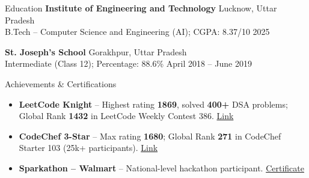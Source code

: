 \documentclass{resume}
\begin{document}
\vspace{-0.5em}
\begin{rSection}{Education}
\vspace{-0.8em}
{\bf Institute of Engineering and Technology} \hfill {Lucknow, Uttar Pradesh}\\
B.Tech -- Computer Science and Engineering (AI); CGPA: 8.37/10 \hfill {2025}

{\bf St. Joseph's School} \hfill {Gorakhpur, Uttar Pradesh}\\
Intermediate (Class 12); Percentage: 88.6\% \hfill {April 2018 -- June 2019}
\end{rSection}

\vspace{-0.5em}
\begin{rSection}{Achievements \& Certifications}
\vspace{-1.0em}
\begin{itemize}
    \item \textbf{LeetCode Knight} -- Highest rating \textbf{1869}, solved \textbf{400+} DSA problems; Global Rank \textbf{1432} in LeetCode Weekly Contest
386. \href{https://leetcode.com/ashishmaurya57/}{Link}
    \item \textbf{CodeChef 3-Star} -- Max rating \textbf{1680}; Global Rank \textbf{271} in CodeChef Starter 103 (25k+ participants).
\href{https://www.codechef.com/users/ashishmauryaam/}{Link}
    \item \textbf{Sparkathon -- Walmart} -- National-level hackathon participant.
\href{https://drive.google.com/file/d/1re8RvOVG5tHVU3uq0T-axogW52Jzgyfj/view?usp=sharing}{Certificate}
\end{itemize}
\end{rSection}
\end{document}
